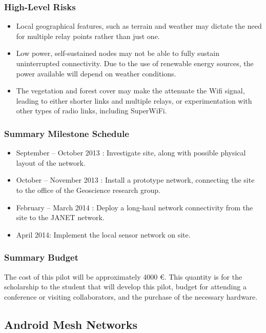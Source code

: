 \documentclass[draftclsnofoot,12pt,journal,onecolumn]{IEEEtran}
\begin{document}
\subsubsection{High-Level Risks}
\begin{itemize}
\item Local geographical features, such as terrain and weather may dictate the need for multiple
relay points rather than just one.
\item Low power, self-sustained nodes may not be able to fully sustain uninterrupted connectivity.
Due to the use of renewable energy sources, the power available will depend on weather
conditions.
\item The vegetation and forest cover may make the attenuate the Wifi signal, leading to either
shorter links and multiple relays, or experimentation with other types of radio links,
including SuperWiFi.
\end{itemize}

\subsubsection{Summary Milestone Schedule}
\begin{itemize}
\item September – October 2013 : Investigate site, along with possible physical layout of the
 network.
\item October – November 2013 : Install a prototype network, connecting the site to the office of
 the Geoscience research group.
\item February – March 2014 : Deploy a long-haul network connectivity from the site to the
 JANET network.
\item April 2014: Implement the local sensor network on site.
\end{itemize}

\subsubsection{Summary Budget}
The cost of this pilot will be approximately 4000 €. This quantity is for the scholarship to the student that will develop this pilot, budget for attending a conference or visiting collaborators, and the purchase of the necessary hardware.

\subsection{Android Mesh Networks}
\end{document}
